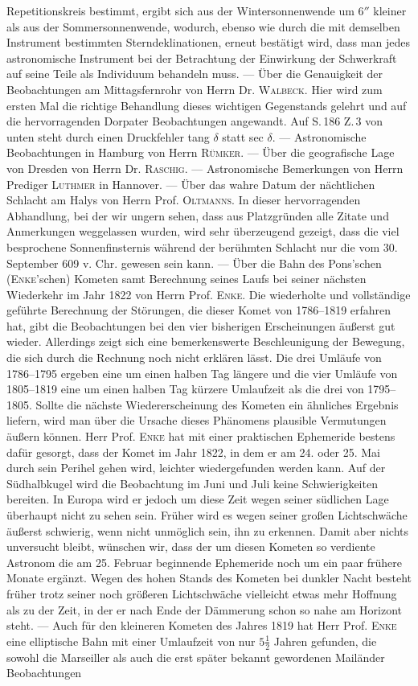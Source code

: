 Repetitionskreis bestimmt, ergibt sich aus der Wintersonnenwende um $6''$ kleiner als aus der Sommersonnenwende, wodurch, ebenso wie durch die mit demselben Instrument bestimmten Sterndeklinationen, erneut bestätigt wird, dass man jedes astronomische Instrument bei der Betrachtung der Einwirkung der Schwerkraft auf seine Teile als Individuum behandeln muss. --- Über die Genauigkeit der Beobachtungen am Mittagsfernrohr von Herrn Dr. \textsc{Walbeck}. Hier wird zum ersten Mal die richtige Behandlung dieses  wichtigen Gegenstands gelehrt und auf die hervorragenden Dorpater Beobachtungen angewandt. Auf S.\,186 Z.\,3 von unten steht durch einen Druckfehler tang $\delta$ statt sec $\delta$. --- Astronomische Beobachtungen in Hamburg von Herrn \textsc{Rümker}. --- Über die geografische Lage von Dresden von Herrn Dr. \textsc{Raschig}. --- Astronomische Bemerkungen von Herrn Prediger \textsc{Luthmer} in Hannover. --- Über das wahre Datum der nächtlichen Schlacht am Halys von Herrn Prof. \textsc{Oltmanns}. In dieser hervorragenden Abhandlung, bei der wir ungern sehen, dass aus Platzgründen alle Zitate und Anmerkungen weggelassen wurden, wird sehr überzeugend gezeigt, dass die viel besprochene Sonnenfinsternis während der berühmten Schlacht nur die vom 30. September 609 v. Chr. gewesen sein kann. --- Über die Bahn des Pons'schen (\textsc{Enke}'schen) Kometen samt Berechnung seines Laufs bei seiner nächsten Wiederkehr im Jahr 1822 von Herrn Prof. \textsc{Enke}. Die wiederholte und vollständige geführte Berechnung der Störungen, die dieser Komet von 1786--1819 erfahren hat, gibt die Beobachtungen bei den vier bisherigen Erscheinungen äußerst gut wieder. Allerdings zeigt sich eine bemerkenswerte Beschleunigung der Bewegung, die sich durch die Rechnung noch nicht erklären lässt. Die drei Umläufe von 1786--1795 ergeben eine um einen halben Tag längere und die vier Umläufe von 1805--1819 eine um einen halben Tag kürzere Umlaufzeit als die drei von 1795--1805. Sollte die nächste Wiedererscheinung des Kometen ein ähnliches Ergebnis liefern, wird man über die Ursache dieses Phänomens plausible Vermutungen äußern können. Herr Prof. \textsc{Enke} hat mit einer praktischen Ephemeride bestens dafür gesorgt, dass der Komet im Jahr 1822, in dem er am 24. oder 25. Mai durch sein Perihel gehen wird, leichter wiedergefunden werden kann. Auf der Südhalbkugel wird die Beobachtung im Juni und Juli keine Schwierigkeiten bereiten. In Europa wird er jedoch um diese Zeit wegen seiner südlichen Lage überhaupt nicht zu sehen sein. Früher wird es wegen seiner großen Lichtschwäche äußerst schwierig, wenn nicht unmöglich sein, ihn zu erkennen. Damit aber nichts unversucht bleibt, wünschen wir, dass der um diesen Kometen so verdiente Astronom die am 25. Februar beginnende Ephemeride noch um ein paar frühere Monate ergänzt. Wegen des hohen Stands des Kometen bei dunkler Nacht besteht früher trotz seiner noch größeren Lichtschwäche vielleicht etwas mehr Hoffnung als zu der Zeit, in der er nach Ende der Dämmerung schon so nahe am Horizont steht. --- Auch für den kleineren Kometen des Jahres 1819 hat Herr Prof. \textsc{Enke} eine elliptische Bahn mit einer Umlaufzeit von nur $5\tfrac{1}{2}$ Jahren gefunden, die sowohl die Marseiller als auch die erst später bekannt gewordenen Mailänder Beobachtungen 